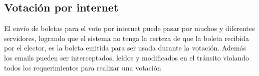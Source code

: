 \subsection{Votación por internet}
El envío de boletas para el voto por internet puede pasar por muchos y diferentes servidores, logrando que el sistema no tenga la certeza de que la boleta recibida por el elector, es la boleta emitida para ser usada durante la votación. Además los emails pueden ser interceptados, leídos y modificados en el tránsito violando todos los requerimientos para realizar una votación


